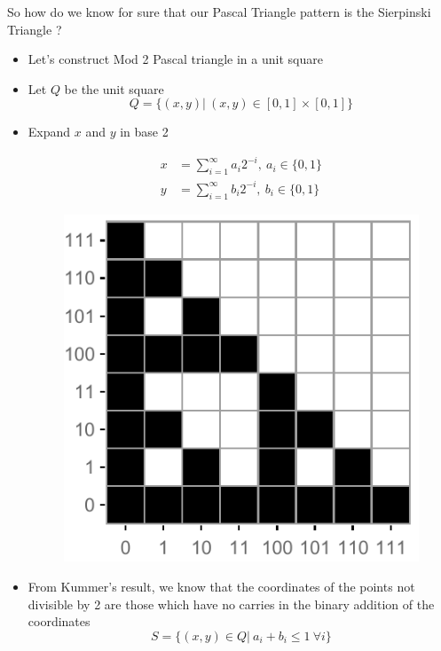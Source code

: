 \documentclass{beamer}
\begin{document}
\begin{frame}
    \centering
    So how do we know for sure that our Pascal Triangle pattern is the Sierpinski Triangle ?
\end{frame}
\begin{frame}
    \begin{itemize}
        \item Let's construct Mod 2 Pascal triangle in a unit square
        \item Let $Q$ be the unit square 
        \begin{equation*}
            Q = \{(x,y) | \ (x,y) \in [0,1] \times [0,1]\}
        \end{equation*}
        \item Expand $x$ and $y$ in base 2 \\
        \begin{minipage}[c]{0.45\textwidth}
            \begin{align*}
                x &= \sum_{i=1}^\infty a_i 2^{-i}, \ a_i \in \{0,1\} \\
                y &= \sum_{i=1}^\infty b_i 2^{-i}, \ b_i \in \{0,1\}
            \end{align*}
        \end{minipage}
        \hfill
        \begin{minipage}[c]{0.45\textwidth}
            \begin{figure}
                \centering
                \includegraphics[scale=0.55]{PascalSq.pdf}
            \end{figure}
        \end{minipage}
        \item From Kummer's result, we know that the coordinates of the points not divisible by 2 are those which have no carries in the binary addition of the coordinates
        \begin{equation*}
            S = \{(x,y) \in Q| \ a_i + b_i \leq 1 \ \forall i\}
        \end{equation*} 
    \end{itemize}
\end{frame}
\end{document}
